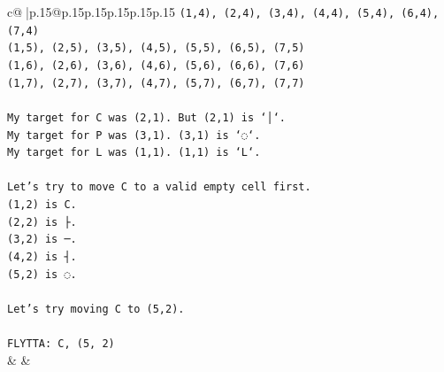 \documentclass{article}
\begin{document}
{\begin{supertabular}{c@{$\;$}|p{.15\linewidth}@{}p{.15\linewidth}p{.15\linewidth}p{.15\linewidth}p{.15\linewidth}p{.15\linewidth}}
{{{\texttt{(1,4), (2,4), (3,4), (4,4), (5,4), (6,4), (7,4)} \\
\texttt{(1,5), (2,5), (3,5), (4,5), (5,5), (6,5), (7,5)} \\
\texttt{(1,6), (2,6), (3,6), (4,6), (5,6), (6,6), (7,6)} \\
\texttt{(1,7), (2,7), (3,7), (4,7), (5,7), (6,7), (7,7)} \\
\\ 
\texttt{My target for C was (2,1). But (2,1) is `│`.} \\
\texttt{My target for P was (3,1). (3,1) is `◌`.} \\
\texttt{My target for L was (1,1). (1,1) is `L`.} \\
\\ 
\texttt{Let's try to move C to a valid empty cell first.} \\
\texttt{(1,2) is C.} \\
\texttt{(2,2) is ├.} \\
\texttt{(3,2) is ─.} \\
\texttt{(4,2) is ┤.} \\
\texttt{(5,2) is ◌.} \\
\\ 
\texttt{Let's try moving C to (5,2).} \\
\\ 
\texttt{FLYTTA: C, (5, 2)} \\
            }
        }
    }
    & & \\ \\


\end{supertabular}}
\end{document}
